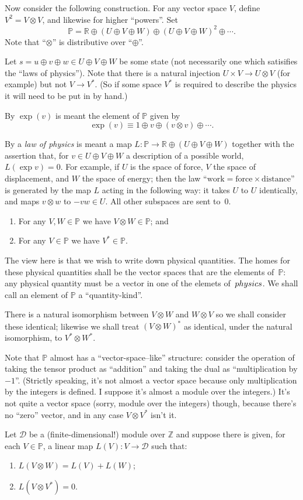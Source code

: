 \documentclass[a4paper, twocolumn, 10pt]{article}
\newcommand{\physics}{\mathbb{P}}
\newcommand{\dimensions}{\mathcal{D}}
\newcommand{\reals}{\mathbb{R}}
\newcommand{\integers}{\mathbb{Z}}
\begin{document}
Now consider the following construction. For any vector space $V$, define
$V^2=V\otimes V$, and likewise for higher ``powers''. Set
\[
\physics = \reals \oplus (U\oplus V\oplus W) \oplus (U\oplus V\oplus W)^2
\oplus \dotsb.
\]
Note that ``$\otimes$'' is distributive over ``$\oplus$''. 

Let $s= u\oplus v\oplus w\in U\oplus V\oplus W$ be some state (not necessarily
one which satisifies the ``laws of physics''). Note that there is a natural
injection $U\times V \to U\otimes V$ (for example) but not $V\to V^*$. (So if
some space $V^*$ is required to describe the physics it will need to be put in
by hand.)

By $\exp(v)$ is meant the element of $\physics$ given by
\[
\exp(v) \equiv 1\oplus
v\oplus (v\otimes v) \oplus \dotsb .
\] 

By a \emph{law of physics} is meant a map $L:\physics\to\reals\oplus (U\oplus V\oplus W)$
together with the assertion that, for $v\in U\oplus V\oplus W$ a description of
a possible world, $L(\exp v)=0$. For example, if $U$ is the space of force, $V$ the
space of displacement, and $W$ the space of energy; then the law ``$\text{work}
= \text{force}\times\text{distance}$'' is generated by the map $L$ acting in the
following way: it takes $U$ to $U$ identically, and maps $v\otimes w$ to $-vw\in
U$. All other subspaces are sent to~$0$.  





\begin{enumerate}
\item For any $V, W\in\physics$ we have $V\otimes W\in\physics$; and
\item For any $V\in\physics$ we have $V^*\in\physics$.
\end{enumerate}

The view here is that we wish to write down physical quantities. The homes for
these physical quantities shall be the vector spaces that are the elements
of~$\physics$: any physical quantity must be a vector in one of the elemets
of~$\\physics$. We shall call an element of $\physics$ a ``quantity-kind''.

There is a natural isomorphism between $V\otimes W$ and $W\otimes V$ so we shall
consider these identical; likewise we shall treat $(V\otimes W)^*$ as identical,
under the natural isomorphism, to $V^*\otimes W^*$. 

Note that $\physics$ almost has a ``vector-space--like'' structure: consider the
operation of taking the tensor product as ``addition'' and taking the dual as
``multiplication by $-1$''. (Strictly speaking, it's not almost a vector space because
only multiplication by the integers is defined. I suppose it's almost a module over the
integers.) It's not quite a vector space (sorry, module over the integers)
though, because there's no ``zero'' vector, and in any case $V\otimes V^*$ isn't it.  

Let $\dimensions$ be a (finite-dimensional!) module over $\integers$ and suppose there is
given, for each $V\in\physics$, a linear map $L(V):V\to\dimensions$ such that:
\begin{enumerate}
\item $L(V\otimes W) = L(V) + L(W)$;
\item $L(V\otimes V^*) = 0$.
\end{enumerate}



  
\end{document}
